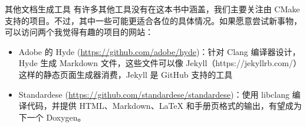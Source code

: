\begin{myNotic}{其他文档生成工具}
有许多其他工具没有在这本书中涵盖，我们主要关注由 CMake 支持的项目。不过，其中一些可能更适合各位的具体情况。如果愿意尝试新事物，可以访问两个我觉得有趣的项目的网站：

\begin{itemize}
\item
Adobe 的 Hyde (\url{https://github.com/adobe/hyde})：针对 Clang 编译器设计，Hyde 生成 Markdown 文件，这些文件可以像 Jekyll（https://jekyllrb.com/）这样的静态页面生成器消费，Jekyll 是 GitHub 支持的工具

\item
Standardese (\url{https://github.com/standardese/standardese})：使用 libclang 编译代码，并提供 HTML、Markdown、LaTeX 和手册页格式的输出，有望成为下一个 Doxygen。
\end{itemize}
\end{myNotic}










































